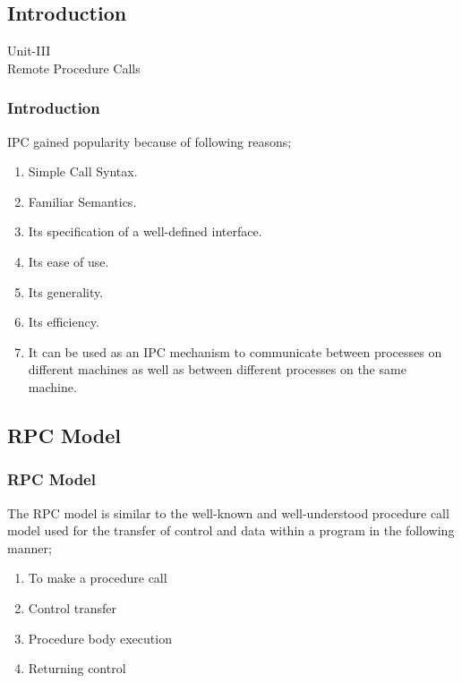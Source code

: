 \documentclass{beamer}
\author[Govt. Colleg of Engg, Jalgaon]{}
\begin{document}
\subsection{Introduction}
\begin{frame}
	\centering
	\large Unit-III\\
	\huge{Remote Procedure Calls} 
\end{frame}

\begin{frame}
	\frametitle{Introduction}
	IPC gained popularity because of following reasons;
	
	\begin{enumerate}
		\item Simple Call Syntax.
		\item Familiar Semantics.
		\item Its specification of a well-defined interface.
		\item Its ease of use.
		\item Its generality.
		\item Its efficiency.
		\item It can be used as an IPC mechanism to communicate between processes on 
		different machines as well as between different processes on the same machine.
	\end{enumerate}	

\end{frame}

\subsection{RPC Model}
\begin{frame}
	\frametitle{RPC Model}
	\vspace{0.5cm}
	The RPC model is similar to the well-known and well-understood procedure call model 
	used for the transfer of control and data within a program in the following manner;
	\vspace{0.5cm}
	\begin{enumerate}
		\item To make a procedure call
		\item Control transfer
		\item Procedure body execution
		\item Returning control
	\end{enumerate}
	\vspace{0.5cm}
	\\
	\vspace{2cm}
\end{frame}
\end{document}
